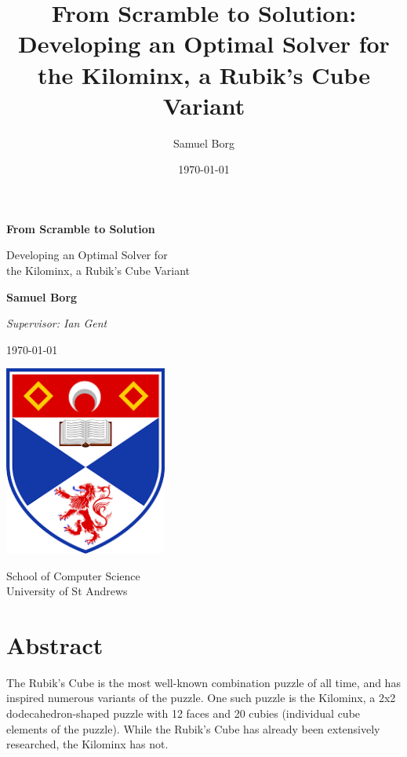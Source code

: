 \documentclass[12pt]{report}
\title{From Scramble to Solution: Developing an Optimal Solver for the Kilominx, a Rubik's Cube Variant}
\author{Samuel Borg}
\date{\today}
\begin{document}
\begin{titlepage}
    \begin{center}
        \vspace*{1.5cm}
            
        \Huge
        \textbf{From Scramble to Solution}
            
        \vspace{0.5cm}
        \LARGE
        Developing an Optimal Solver for \\ the Kilominx, a Rubik's Cube Variant

        \vspace{2cm}
        \textbf{Samuel Borg}

        \Large
        \textit{Supervisor: Ian Gent}

        \vspace{0.5cm}

        \large
        \today

        \vspace{2.5cm}

        \includegraphics[width=0.4\textwidth]{unilogo}

        \Large
        \vspace{0.5cm}
        School of Computer Science\\
        University of St Andrews
    \end{center}
\end{titlepage}

\chapter*{Abstract}
The Rubik's Cube is the most well-known combination puzzle of all time, and has inspired numerous variants of the puzzle. One such puzzle is the Kilominx, a 2x2 dodecahedron-shaped puzzle with 12 faces and 20 cubies (individual cube elements of the puzzle). While the Rubik's Cube has already been extensively researched, the Kilominx has not.
\end{document}
